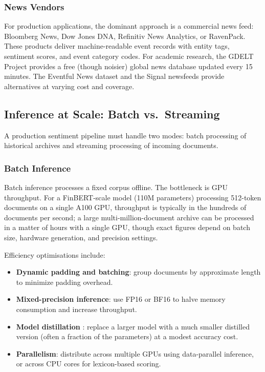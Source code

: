 \subsubsection*{News Vendors}

For production applications, the dominant approach is a commercial news feed: Bloomberg News, Dow Jones DNA, Refinitiv News Analytics, or RavenPack. These products deliver machine-readable event records with entity tags, sentiment scores, and event category codes. For academic research, the GDELT Project provides a free (though noisier) global news database updated every 15 minutes. The Eventful News dataset and the Signal newsfeeds provide alternatives at varying cost and coverage.

\subsection{Inference at Scale: Batch vs.\ Streaming}
\label{sec:ch09-inference-at-scale}

A production sentiment pipeline must handle two modes: batch processing of historical archives and streaming processing of incoming documents.

\subsubsection*{Batch Inference}

Batch inference processes a fixed corpus offline. The bottleneck is GPU throughput. For a FinBERT-scale model (110M parameters) processing 512-token documents on a single A100 GPU, throughput is typically in the hundreds of documents per second; a large multi-million-document archive can be processed in a matter of hours with a single GPU, though exact figures depend on batch size, hardware generation, and precision settings.

Efficiency optimisations include:
\begin{itemize}
  \item \textbf{Dynamic padding and batching}: group documents by approximate length to minimize padding overhead.
  \item \textbf{Mixed-precision inference}: use FP16 or BF16 to halve memory consumption and increase throughput.
  \item \textbf{Model distillation} \citep{hinton2015distilling}: replace a larger model with a much smaller distilled version (often a fraction of the parameters) at a modest accuracy cost.
  \item \textbf{Parallelism}: distribute across multiple GPUs using data-parallel inference, or across CPU cores for lexicon-based scoring.
\end{itemize}

